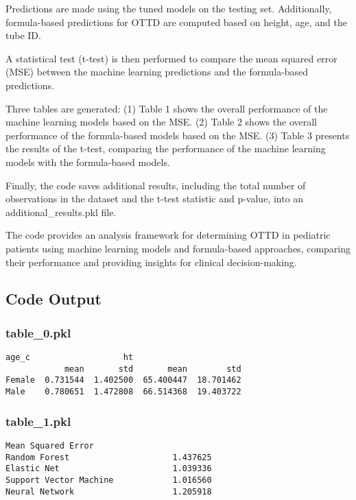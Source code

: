 \documentclass[11pt]{article}
\begin{document}
Predictions are made using the tuned models on the testing set. Additionally, formula-based predictions for OTTD are computed based on height, age, and the tube ID.

A statistical test (t-test) is then performed to compare the mean squared error (MSE) between the machine learning predictions and the formula-based predictions.

Three tables are generated:
(1) Table 1 shows the overall performance of the machine learning models based on the MSE.
(2) Table 2 shows the overall performance of the formula-based models based on the MSE.
(3) Table 3 presents the results of the t-test, comparing the performance of the machine learning models with the formula-based models.

Finally, the code saves additional results, including the total number of observations in the dataset and the t-test statistic and p-value, into an additional\_results.pkl file.

The code provides an analysis framework for determining OTTD in pediatric patients using machine learning models and formula-based approaches, comparing their performance and providing insights for clinical decision-making.

\subsection{Code Output}

\subsubsection*{table\_0.pkl}

\begin{Verbatim}[tabsize=4]
           age_c                   ht
            mean       std       mean        std
Female  0.731544  1.402500  65.400447  18.701462
Male    0.780651  1.472808  66.514368  19.403722
\end{Verbatim}

\subsubsection*{table\_1.pkl}

\begin{Verbatim}[tabsize=4]
                        Mean Squared Error
Random Forest                     1.437625
Elastic Net                       1.039336
Support Vector Machine            1.016560
Neural Network                    1.205918
\end{Verbatim}
\end{document}
